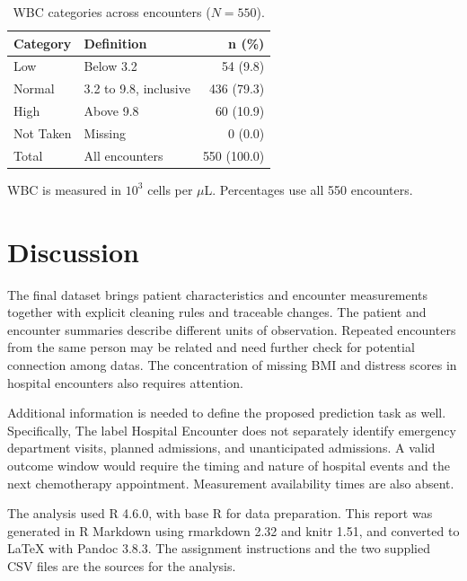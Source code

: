 \documentclass[11pt,letterpaper]{article}
\begin{document}
\begin{table}[!htbp]
\centering
\caption{WBC categories across encounters ($N = 550$).}\label{tab:wbc}

\begin{tabular}{llr}
\toprule
Category & Definition & n (\%)\\
\midrule
Low & Below 3.2 & 54 (9.8)\\
Normal & 3.2 to 9.8, inclusive & 436 (79.3)\\
High & Above 9.8 & 60 (10.9)\\
Not Taken & Missing & 0 (0.0)\\
Total & All encounters & 550 (100.0)\\
\bottomrule
\end{tabular}

\par\vspace{5pt}\begin{minipage}{0.90\textwidth}\small
WBC is measured in $10^3$ cells per $\mu$L. Percentages use all 550 encounters.
\end{minipage}
\end{table}

\FloatBarrier

\section{Discussion}\label{discussion}

The final dataset brings patient characteristics and encounter
measurements together with explicit cleaning rules and traceable
changes. The patient and encounter summaries describe different units of
observation. Repeated encounters from the same person may be related and
need further check for potential connection among datas. The
concentration of missing BMI and distress scores in hospital encounters
also requires attention.

Additional information is needed to define the proposed prediction task
as well. Specifically, The label Hospital Encounter does not separately
identify emergency department visits, planned admissions, and
unanticipated admissions. A valid outcome window would require the
timing and nature of hospital events and the next chemotherapy
appointment. Measurement availability times are also absent.

The analysis used R 4.6.0, with base R for data preparation. This report
was generated in R Markdown using rmarkdown 2.32 and knitr 1.51, and
converted to LaTeX with Pandoc 3.8.3. The assignment instructions and
the two supplied CSV files are the sources for the analysis.
\end{document}
